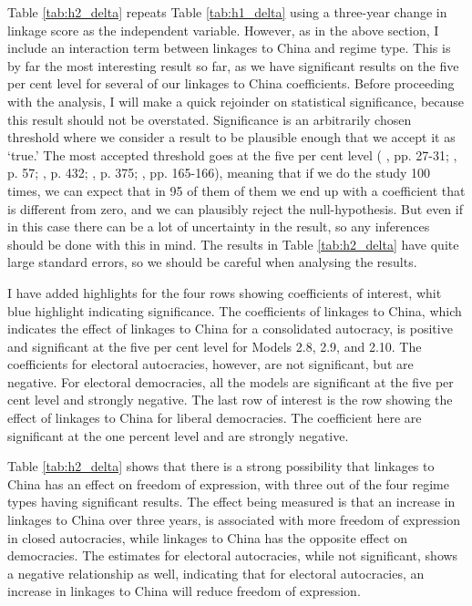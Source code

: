 Table \ref{tab:h2_delta} repeats Table \ref{tab:h1_delta} using a three-year change in linkage score as the independent variable. However, as in the above section, I include an interaction term between linkages to China and regime type. This is by far the most interesting result so far, as we have significant results on the five per cent level for several of our linkages to China coefficients. Before proceeding with the analysis, I will make a quick rejoinder on statistical significance, because this result should not be overstated. Significance is an arbitrarily chosen threshold where we consider a result to be plausible enough that we accept it as `true.' The most accepted threshold goes at the five per cent level (\citeauthor{christophersen_introduksjon_2018} \citeyear{christophersen_introduksjon_2018}, pp. 27-31; \citeauthor{gelman_regression_2021} \citeauthor{gelman_regression_2021}, p. 57; \citeauthor{halperin_political_2020} \citeyear{halperin_political_2020},  p. 432; \citeauthor{hellevik_forskningsmetode_2002} \citeyear{hellevik_forskningsmetode_2002}, p. 375; \citeauthor{kellstedt_fundamentals_2018} \citeyear{kellstedt_fundamentals_2018}, pp. 165-166), meaning that if we do the study 100 times, we can expect that in 95 of them of them we end up with a coefficient that is different from zero, and we can plausibly reject the null-hypothesis. But even if in this case there can be a lot of uncertainty in the result, so any inferences should be done with this in mind. The results in Table \ref{tab:h2_delta} have quite large standard errors, so we should be careful when analysing the results.

I have added highlights for the four rows showing coefficients of interest, whit blue highlight indicating significance. The coefficients of linkages to China, which indicates the effect of linkages to China for a consolidated autocracy, is positive and significant at the five per cent level for Models 2.8, 2.9, and 2.10. The coefficients for electoral autocracies, however, are not significant, but are negative. For electoral democracies, all the models are significant at the five per cent level and strongly negative. The last row of interest is the row showing the effect of linkages to China for liberal democracies. The coefficient here are significant at the one percent level and are strongly negative. 

Table \ref{tab:h2_delta} shows that there is a strong possibility that linkages to China has an effect on freedom of expression, with three out of the four regime types having significant results. The effect being measured is that an increase in linkages to China over three years, is associated with more freedom of expression in closed autocracies, while linkages to China has the opposite effect on democracies. The estimates for electoral autocracies, while not significant, shows a negative relationship as well, indicating that for electoral autocracies, an increase in linkages to China will reduce freedom of expression.

